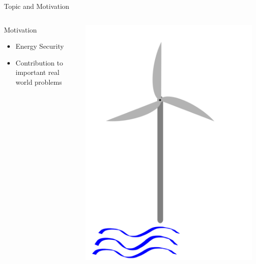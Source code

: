 \documentclass[usenames,dvipsnames,aspectratio=169]{beamer}
\begin{document}
\begin{frame}{Topic and Motivation}
\begin{columns}[T]
\begin{column}{.68\textwidth}
\begin{itemize}
	\end{itemize}
	\vspace{0.5cm}
	Motivation
	\begin{itemize}
		\item Energy Security
		\item Contribution to important real world problems
	\end{itemize}
\end{column}%
\hfill
\begin{column}{.28\textwidth}
\includegraphics[scale=0.2]{icon_offshore_wind_turbine.png}
\end{column}%
\end{columns}
\end{frame}
\end{document}
